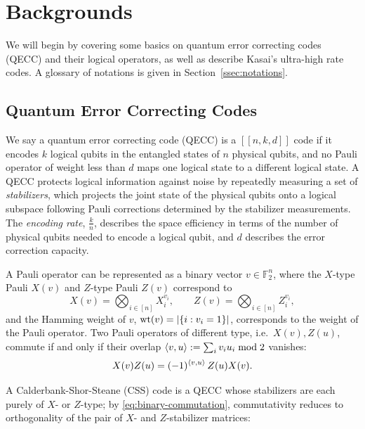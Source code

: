 \section{Backgrounds}\label{sec:bakcgournd}
We will begin by covering some basics on quantum error correcting codes (QECC) and their logical operators, as well as describe Kasai's ultra-high rate codes. A glossary of notations is given in Section~\ref{ssec:notations}. 

\subsection{Quantum Error Correcting Codes}\label{ssec:qec-basics}

We say a quantum error correcting code (QECC) is a $[[n,k,d]]$ code if it encodes $k$ logical qubits in the entangled states of $n$ physical qubits, and no Pauli operator of weight less than $d$ maps one logical state to a different logical state. A QECC protects logical information against noise by repeatedly measuring a set of \textit{stabilizers}, which projects the joint state of the physical qubits onto a logical subspace following Pauli corrections determined by the stabilizer measurements. The \emph{encoding rate}, $\frac{k}{n}$, describes the space efficiency in terms of the number of physical qubits needed to encode a logical qubit, and $d$ describes the error correction capacity.


A Pauli operator can be represented as a binary vector $v\in \mathbb F_2^n$, where the $X$-type Pauli $X(v)$ and $Z$-type Pauli $Z(v)$ correspond to
\[
X(v) = \bigotimes_{i\in[n]} X_i^{v_i}, \qquad
Z(v) = \bigotimes_{i\in[n]} Z_i^{v_i},
\]
and the Hamming weight of $v$, $\mathrm{wt}(v) = |\{i: v_i = 1\}|$, corresponds to the weight of the  Pauli operator. Two Pauli operators of different type, i.e.\ $X(v), Z(u)$, commute if and only if their overlap $\langle v,u \rangle := \sum_i v_iu_i \bmod 2$ vanishes:
\begin{equation}\label{eq:binary-commutation}
    X(v)Z(u) = (-1)^{\langle v,u \rangle}\, Z(u) X(v).
\end{equation}
 
 
A Calderbank-Shor-Steane (CSS) code is a QECC whose stabilizers are each purely
of $X$- or $Z$-type; by \eqref{eq:binary-commutation}, commutativity reduces to orthogonality of the pair of $X$- and $Z$-stabilizer matrices:

